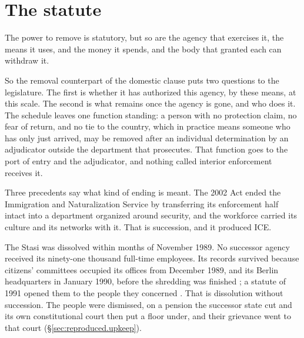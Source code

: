 \section{The statute}
\label{sec:11.4}
The power to remove is statutory, but so are the agency that exercises it, the means it uses, and the money it spends, and the body that granted each can withdraw it.

So the removal counterpart of the domestic clause puts two questions to the legislature. The first is whether it has authorized this agency, by these means, at this scale. The second is what remains once the agency is gone, and who does it.
The schedule leaves one function standing: a person with no protection claim, no fear of return, and no tie to the country, which in practice means someone who has only just arrived, may be removed after an individual determination by an adjudicator outside the department that prosecutes. That function goes to the port of entry and the adjudicator, and nothing called interior enforcement receives it.

Three precedents say what kind of ending is meant. The 2002 Act ended the Immigration and Naturalization Service by transferring its enforcement half intact into a department organized around security, and the workforce carried its culture and its networks with it. That is succession, and it produced ICE.

The Stasi was dissolved within months of November 1989. No successor agency received its ninety-one thousand full-time employees. Its records survived because citizens' committees occupied its offices from December 1989, and its Berlin headquarters in January 1990, before the shredding was finished \autocite{bpb2023stasi}; a statute of 1991 opened them to the people they concerned \autocite{stug1991}. That is dissolution without succession. The people were dismissed, on a pension the successor state cut and its own constitutional court then put a floor under, and their grievance went to that court (\S\ref{sec:reproduced.upkeep}).

